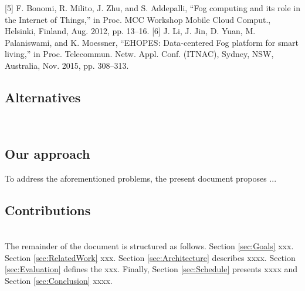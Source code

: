 [5] F. Bonomi, R. Milito, J. Zhu, and S. Addepalli, “Fog computing and its
role in the Internet of Things,” in Proc. MCC Workshop Mobile Cloud
Comput., Helsinki, Finland, Aug. 2012, pp. 13–16.
[6] J. Li, J. Jin, D. Yuan, M. Palaniswami, and K. Moessner, “EHOPES:
Data-centered Fog platform for smart living,” in Proc. Telecommun.
Netw. Appl. Conf. (ITNAC), Sydney, NSW, Australia, Nov. 2015,
pp. 308–313.



\subsection{Alternatives}
\noindent\tab [Alternatives]\\

\subsection{Our approach}
\noindent\tab To address the aforementioned problems, the present document proposes ...\\

\subsection{Contributions}
\noindent\tab [Contributions]\\
\noindent\tab The remainder of the document is structured as follows. Section \ref{sec:Goals} xxx. Section \ref{sec:RelatedWork} xxx. Section \ref{sec:Architecture} describes xxxx. Section \ref{sec:Evaluation} defines the xxx. Finally, Section \ref{sec:Schedule} presents xxxx and Section \ref{sec:Conclusion} xxxx.


